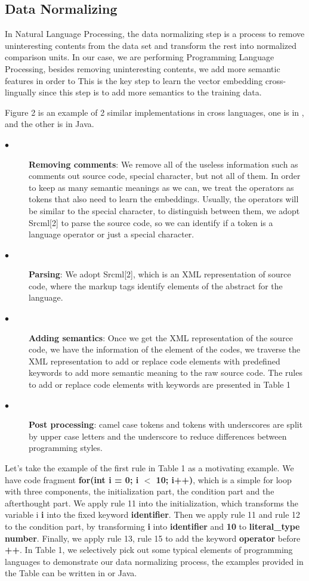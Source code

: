 \subsection{Data Normalizing}

In Natural Language Processing, the data normalizing step is a process to remove uninteresting contents from the data set and transform the rest into normalized comparison units. In our case, we are performing Programming Language Processing, besides removing uninteresting contents, we add more semantic features in order to 
This is the key step to learn the vector embedding cross-lingually since this step is to add more semantics to the training data. 

Figure 2 is an example of 2 similar implementations in cross languages, one is in , and the other is in Java.

\begin{description}
	\item [$\bullet$] \textbf{Removing comments}: We remove all of the useless information such as comments out source code, special character, but not all of them. In order to keep as many semantic meanings as we can, we treat the operators as tokens that also need to learn the embeddings. Usually, the operators will be similar to the special character, to distinguish between them, we adopt Srcml[2] to parse the source code, so we can identify if a token is a language operator or just a special character.
	\item [$\bullet$] \textbf{Parsing}: We adopt Srcml[2], which is an XML representation of source code, where the markup tags identify elements of the abstract for the language.
	\item [$\bullet$] \textbf{Adding semantics}: Once we get the XML representation of the source code, we have the information of the element of the codes, we traverse the XML representation to add or replace code elements with predefined keywords to add more semantic meaning to the raw source code. The rules to add or replace code elements with keywords are presented in Table 1
	\item [$\bullet$] \textbf{Post processing}: camel case tokens and tokens with underscores are split by upper case letters and the underscore to reduce differences between programming styles.
\end{description}
Let's take the example of the first rule in Table 1 as a motivating example. We have code fragment \textbf{for(int i = 0; i $<$ 10; i++)}, which is a simple for loop with three components, the initialization part, the condition part and the afterthought part. We apply rule 11 into the initialization, which transforms the variable i \textbf{i} into the fixed keyword \textbf{identifier}. Then we apply rule 11 and rule 12 to the condition part, by transforming \textbf{i} into \textbf{identifier} and \textbf{10} to \textbf{literal\_type number}. Finally, we apply rule 13, rule 15 to add the keyword \textbf{operator} before \textbf{++}. In Table 1, we selectively pick out some typical elements of programming languages to demonstrate our data normalizing process, the examples provided in the Table can be written in  or Java. 

